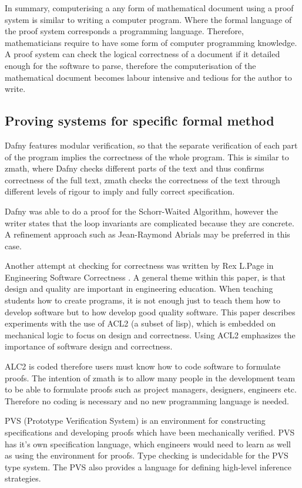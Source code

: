 In summary, computerising a any form of mathematical document using a proof
system is similar to writing a computer program. Where the formal language of
the proof system corresponds a programming language. Therefore, mathematicians
require to have some form of computer programming knowledge. A proof system can
check the logical correctness of a document if it detailed enough for the
software to parse, therefore the computerisation of the mathematical document
becomes labour intensive and tedious for the author to write.

\subsection{Proving systems for specific formal method}


Dafny \cite{dafny} features modular verification, so that the separate
verification of each part of the program implies the correctness of the whole
program. This is similar to \gls{zmath}, where Dafny checks different parts of
the text and thus confirms correctness of the full text, \gls{zmath} checks the
correctness of the text through different levels of rigour to imply and fully
correct specification.

Dafny was able to do a proof for the Schorr-Waited Algorithm, however the writer
states that the loop invariants are complicated because they are concrete. A
refinement approach such as Jean-Raymond Abrials \cite{abrial} may be preferred
in this case.  

Another attempt at checking for correctness was written by Rex L.Page in
Engineering Software Correctness \cite{engineeringsoftwarecorrectness}. A
general theme within this paper, is that design and quality are important in
engineering education. When teaching students how to create programs, it is not
enough just to teach them how to develop software but to how develop good
quality software. This paper describes experiments with the use of ACL2 (a
subset of lisp), which is embedded on mechanical logic to focus on design and
correctness. Using ACL2 emphasizes the importance of software design and
correctness. 

ALC2 is coded therefore users must know how to code software to formulate
proofs. The intention of \gls{zmath} is to allow many people in the development
team to be able to formulate proofs such as project managers, designers,
engineers etc. Therefore no coding is necessary and no new programming language
is needed.

PVS (Prototype Verification System) \cite{pvs} is an environment for
constructing specifications and developing proofs which have been mechanically
verified. PVS has it's own specification language, which engineers would need to
learn as well as using the environment for proofs. Type checking is undecidable
for the PVS type system. The PVS also provides a language for defining
high-level inference strategies.


